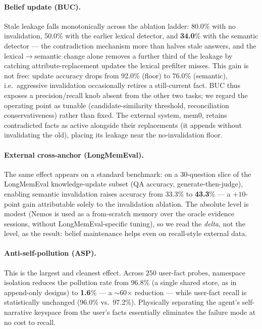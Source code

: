 \documentclass[11pt]{article}
\newcommand{\bucSLRfull}{\textbf{34.0}}   %
\newcommand{\bucSLRvone}{50.0}            %
\newcommand{\bucSLRnone}{80.0}            %
\newcommand{\bucUAfull}{76.0}
\newcommand{\bucUAnone}{92.0}
\newcommand{\aspPRiso}{\textbf{1.6}}      %
\newcommand{\aspPRshared}{96.8}           %
\newcommand{\aspUFRiso}{97.2}
\newcommand{\aspUFRshared}{96.0}
\newcommand{\lmeAccFull}{\textbf{43.3}}   %
\newcommand{\lmeAccNone}{33.3}            %
\newcommand{\lmeN}{30}
\begin{document}
\paragraph{Belief update (BUC).} Stale leakage falls monotonically across the ablation
ladder: \bucSLRnone{}\% with no invalidation, \bucSLRvone{}\% with the earlier lexical
detector, and \bucSLRfull{}\% with the semantic detector --- the contradiction mechanism more
than halves stale answers, and the lexical$\rightarrow$semantic change alone removes a further
third of the leakage by catching attribute-replacement updates the lexical prefilter misses.
This gain is not free: update accuracy drops from \bucUAnone{}\% (floor) to \bucUAfull{}\%
(semantic), i.e.\ aggressive invalidation occasionally retires a still-current fact. BUC thus
exposes a precision/recall knob absent from the other two tasks; we regard the operating point
as tunable (candidate-similarity threshold, reconciliation conservativeness) rather than fixed.
The external system, mem0, retains contradicted facts as active alongside their replacements
(it appends without invalidating the old), placing its leakage near the no-invalidation floor.

\paragraph{External cross-anchor (LongMemEval).} The same effect appears on a standard
benchmark: on a \lmeN{}-question slice of the LongMemEval knowledge-update subset (QA accuracy,
generate-then-judge), enabling semantic invalidation raises accuracy from \lmeAccNone{}\% to
\lmeAccFull{}\% --- a $+10$-point gain attributable solely to the invalidation ablation. The
absolute level is modest (Nemos is used as a from-scratch memory over the oracle evidence
sessions, without LongMemEval-specific tuning), so we read the \emph{delta}, not the level, as
the result: belief maintenance helps even on recall-style external data.

\paragraph{Anti-self-pollution (ASP).} This is the largest and cleanest effect. Across
$250$ user-fact probes, namespace isolation reduces the pollution rate from \aspPRshared{}\%
(a single shared store, as in append-only designs) to \aspPRiso{}\% --- a $\sim$60$\times$
reduction --- while user-fact recall is statistically unchanged (\aspUFRshared{}\% vs.\
\aspUFRiso{}\%). Physically separating the agent's self-narrative keyspace from the user's
facts essentially eliminates the failure mode at no cost to recall.
\end{document}
